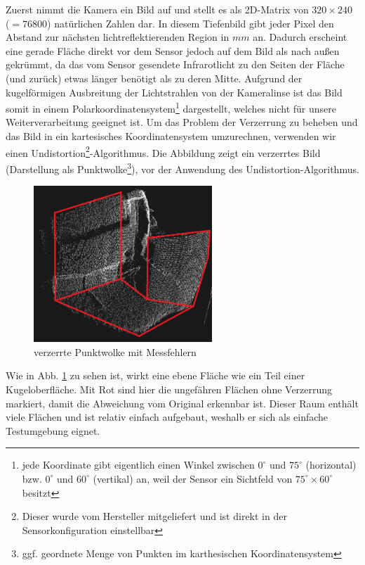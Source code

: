 \documentclass[a4paper,12pt,ngerman]{scrartcl}
\begin{document}
Zuerst nimmt die Kamera ein Bild auf und stellt es als 2D-Matrix von $320 \times 240$ ($=76800$) natürlichen Zahlen dar.
In diesem Tiefenbild gibt jeder Pixel den Abstand zur nächsten lichtreflektierenden Region in $mm$ an. 
Dadurch erscheint eine gerade Fläche direkt vor dem Sensor jedoch auf dem Bild als nach außen gekrümmt, 
da das vom Sensor gesendete Infrarotlicht zu den Seiten der Fläche (und zurück) etwas länger
benötigt als zu deren Mitte. Aufgrund der kugelförmigen Ausbreitung der Lichtstrahlen von der Kameralinse ist das
Bild somit in einem Polarkoordinatensystem\footnote{jede Koordinate gibt eigentlich einen Winkel zwischen
	$0^{\circ}$ und $75^{\circ}$ (horizontal) bzw. $0^{\circ}$ und $60^{\circ}$ (vertikal) an,
weil der Sensor ein Sichtfeld von $75^{\circ} \times 60^{\circ}$ besitzt} dargestellt, welches nicht für unsere Weiterverarbeitung geeignet ist. Um das Problem der Verzerrung zu beheben und das Bild in ein kartesisches
Koordinatensystem umzurechnen, verwenden wir einen Undistortion\footnote{Dieser wurde vom Hersteller mitgeliefert und ist direkt in der Sensorkonfiguration einstellbar}-Algorithmus.
Die Abbildung zeigt ein verzerrtes Bild (Darstellung als Punktwolke\footnote{ggf. geordnete Menge von Punkten im karthesischen Koordinatensystem}), vor der Anwendung des Undistortion-Algorithmus.
\begin{figure}[H] \label{distorted_pointcloud_img}
	\centering
	\includegraphics[width=0.6\textwidth]{no_undistortion2}
	\caption{verzerrte Punktwolke mit Messfehlern}
\end{figure}
Wie in Abb. \ref{distorted_pointcloud_img} zu sehen ist, wirkt eine ebene Fläche wie ein Teil einer Kugeloberfläche. Mit Rot sind hier die ungefähren Flächen ohne Verzerrung markiert, damit die Abweichung vom Original erkennbar ist.
Dieser Raum enthält viele Flächen und ist relativ einfach aufgebaut, weshalb er sich als einfache Testumgebung eignet.
\end{document}
